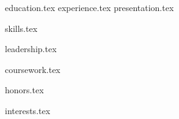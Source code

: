 \documentclass[letterpaper]{awesome-cv}
\newcommand*{\sectiondir}{resume/}
\begin{document}
\makecvheader


{education.tex}
{experience.tex}
{presentation.tex}

\begin{minipage}[t]{.66\textwidth}
{skills.tex}
\end{minipage}
\begin{minipage}[t]{.01\textwidth}
\hfill %
\end{minipage}
\begin{minipage}[t]{.33\textwidth}
{leadership.tex}
\end{minipage}


\begin{minipage}[t]{.39\textwidth}
{coursework.tex}
\end{minipage}
\begin{minipage}[t]{.01\textwidth}
\hfill %
\end{minipage}
\begin{minipage}[t]{.38\textwidth}
{honors.tex}
\end{minipage}
\begin{minipage}[t]{.01\textwidth}
\hfill %
\end{minipage}
\begin{minipage}[t]{.20\textwidth}
{interests.tex}
\end{minipage}
\end{document}
